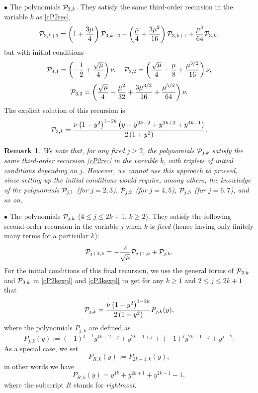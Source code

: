 \documentclass[a4paper]{article}
\newtheorem{remark}{Remark}
\newcommand{\Por}{P_{R,k}(y)}
\newcommand{\cP}{{\cal{P}}}
\begin{document}
$\bullet$  The polynomials $\cP_{3,k}$. They satisfy the same third-order recursion in the variable $k$ as \eqref{cP2rec},
\[
\cP_{3,k+3}=\left(1+\frac{3\mu}{4}\right)\cP_{3,k+2}-\left(\frac{\mu }{4}+\frac{3 \mu ^2}{16}\right)\cP_{3,k+1}+\frac{\mu ^3}{64}\cP_{3,k},
\]
but with initial conditions 
\[
\cP_{3,1}=\left(-\frac{1}{2}+\frac{\sqrt{\mu }}{4}\right) \nu, \quad \cP_{3,2}=\left(\frac{\sqrt{\mu} }{4}-\frac{\mu}{8}+\frac{\mu ^{3/2}}{16}\right) \nu,
\]
\[
\cP_{3,3}=\left(\frac{\sqrt{\mu }}{4}-\frac{\mu ^2}{32}+\frac{3 \mu ^{3/2}}{16}+\frac{\mu ^{5/2}}{64}\right) \nu.
\]
The explicit solution of this recursion is
\begin{equation}\label{cP3kexpl}
\cP_{3,k}=\frac{\nu  \left(1-y^2\right)^{1-2 k} \left(y-y^{2 k-2}+y^{2 k+2}+y^{4 k-1}\right)}{2 \left(1+y^2\right)}.
\end{equation}
\begin{remark}
We note that, for any \emph{fixed} $j\ge 2$, the polynomials $\cP_{j,k}$ satisfy the same third-order recursion \eqref{cP2rec} in the variable $k$, with triplets of initial conditions depending on $j$. However, we cannot use this approach to proceed, since setting up the initial conditions would require, among others, the knowledge of the  polynomials $\cP_{j,1}$ (for $j=2, 3$),  $\cP_{j,2}$ (for $j=4, 5$), $\cP_{j,3}$ (for $j=6, 7$), and so on. 
\end{remark}



$\bullet$  The polynomials $\cP_{j,k}$ ($4\le j\le 2k+1$, $k\ge 2$). They satisfy the following second-order recursion in the variable $j$ when $k$ is \emph{fixed} (hence having only finitely many terms for a particular $k$):  
\[
\cP_{j+2,k}=-\frac{2}{\sqrt{\mu }}\cP_{j+1,k}+\cP_{j,k}.
\]
For the initial conditions of this final recursion, we use the general forms of $\cP_{2,k}$ and $\cP_{3,k}$ in \eqref{cP2kexpl} and \eqref{cP3kexpl} to get for any $k\ge 1$ and $2\le j\le 2k+1$ that 
\[
\cP_{j,k}=\frac{\nu  \left(1-y^2\right)^{1-2 k}}{2 \left(1+y^2\right)}P_{j,k}(y), 
\]
where the polynomials $P_{j,k}$ are defined as
\begin{equation}\label{Pjky}
P_{j,k}(y):=(-1)^{j-1} y^{4 k+2-j}+y^{2 k-1+j}+(-1)^j y^{2 k+1-j}+y^{j-2}.
\end{equation}
As a special case, we set
\[
\Por:=P_{2k+1,k}(y),
\]
in other words we have
\[\Por=y^{4 k}+y^{2 k+1}+y^{2 k-1}-1,\]
where the subscript $R$ stands for \textit{rightmost}.
\end{document}
